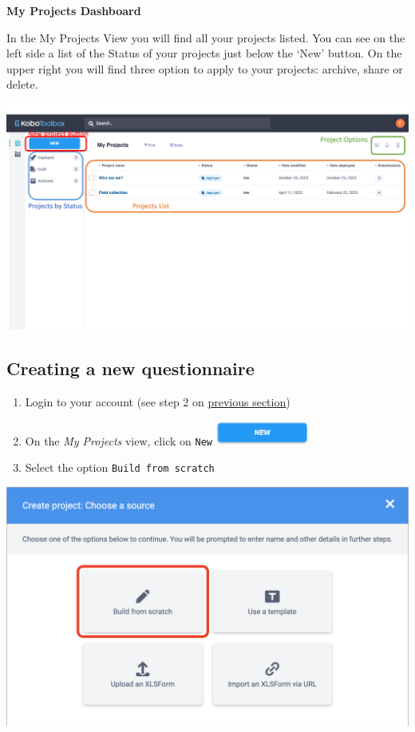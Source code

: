\documentclass[
  letterpaper,
  DIV=11,
  numbers=noendperiod]{scrartcl}
\begin{document}
\textbf{My Projects Dashboard}

In the My Projects View you will find all your projects listed. You can
see on the left side a list of the Status of your projects just below
the `New' button. On the upper right you will find three option to apply
to your projects: archive, share or delete.

\includegraphics{kobotoolbox_tutorial_files/img/img3.png}

\subsection{Creating a new
questionnaire}\label{creating-a-new-questionnaire}

\begin{enumerate}
\def\labelenumi{\arabic{enumi}.}
\item
  Login to your account (see step 2 on
  \href{https://6f55d0be68b34246b8b812a68d153338.app.posit.cloud/p/b6def2a0/\#getting-started-in-kobotoolbox}{previous
  section})
\item
  On the \emph{My Projects} view, click on \texttt{New}
  \includegraphics{kobotoolbox_tutorial_files/img/img4.png}
\item
  Select the option \texttt{Build\ from\ scratch}
\end{enumerate}

\includegraphics{kobotoolbox_tutorial_files/img/img5.png}
\end{document}
